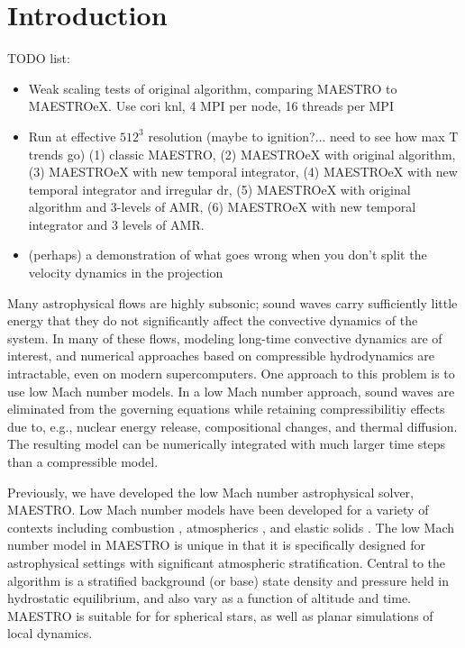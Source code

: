 \documentclass{aastex62}
\begin{document}
\section{Introduction} \label{sec:intro}

TODO list:
\begin{itemize}
\item Weak scaling tests of original algorithm, comparing MAESTRO to MAESTROeX.  Use cori knl, 4 MPI per node, 16 threads per MPI
\item Run at effective $512^3$ resolution (maybe to ignition?... need to see how max T trends go) (1) classic MAESTRO, (2) MAESTROeX with original algorithm, (3) MAESTROeX with new temporal integrator, (4) MAESTROeX with new temporal integrator and irregular dr, (5) MAESTROeX with original algorithm and 3-levels of AMR, (6) MAESTROeX with new temporal integrator and 3 levels of AMR.
\item (perhaps) a demonstration of what goes wrong when you don't split the velocity dynamics in the projection
\end{itemize}

Many astrophysical flows are highly subsonic; sound waves carry sufficiently little energy that they do not significantly affect the convective dynamics of the system.
In many of these flows, modeling long-time convective dynamics are of interest, and numerical approaches based on compressible hydrodynamics are intractable, even on modern supercomputers.
One approach to this problem is to use low Mach number models.
In a low Mach number approach, sound waves are eliminated from the governing equations while retaining compressibilitiy effects due to, e.g., nuclear energy release, compositional changes, and thermal diffusion.
The resulting model can be numerically integrated with much larger time steps than a compressible model.

Previously, we have developed the low Mach number astrophysical solver, MAESTRO.
Low Mach number models have been developed for a variety of contexts including combustion \citep{day2000numerical}, atmospherics \citep{duarte2015low}, and elastic solids \citep{abbate2017all}.
The low Mach number model in MAESTRO is unique in that it is specifically designed for astrophysical settings with significant atmospheric stratification.
Central to the algorithm is a stratified background (or base) state density and pressure held in hydrostatic equilibrium, and also vary as a function of altitude and time.
MAESTRO is suitable for for spherical stars, as well as planar simulations of local dynamics.
\end{document}
